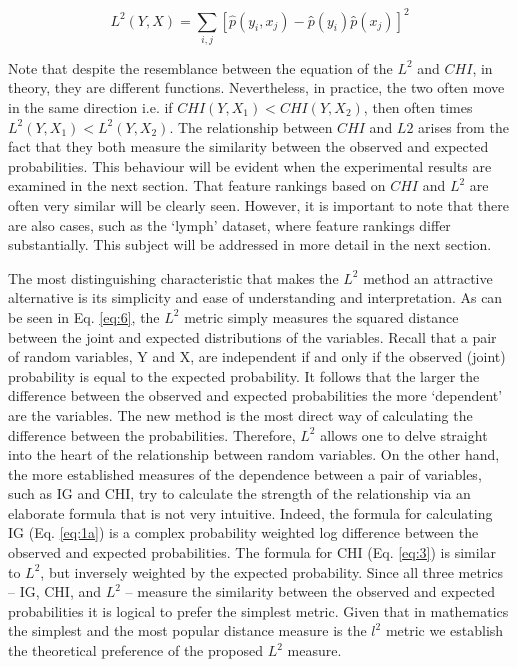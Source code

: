 \documentclass[review]{elsarticle}
\begin{document}
\begin{equation}\label{eq:6}
L^2 (Y,X)=\sum_{i,j} [ \hat{p}(y_i,x_j )-p ̂(y_i ) p ̂(x_j )]^2 
\end{equation}

Note that despite the resemblance between the equation of the $ L^2 $ and $ CHI $, in theory, they are different functions. Nevertheless, in practice, the two often move in the same direction i.e. if $ CHI(Y,X_1 ) < CHI(Y,X_2 ) $, then often times $  L^2 (Y,X_1 ) < L^2 (Y,X_2 ) $. The relationship between $ CHI $ and $ L2 $ arises from the fact that they both measure the similarity between the observed and expected probabilities. This behaviour will be evident when the experimental results are examined in the next section. That feature rankings based on $ CHI $ and $ L^2 $ are often very similar will be clearly seen. However, it is important to note that there are also cases, such as the ‘lymph’ dataset, where feature rankings differ substantially. This subject will be addressed in more detail in the next section. 

The most distinguishing characteristic that makes the $ L^2 $ method an attractive alternative is its simplicity and ease of understanding and interpretation. As can be seen in Eq. \ref{eq:6}, the $ L^2 $ metric simply measures the squared distance between the joint and expected distributions of the variables. Recall that a pair of random variables,  Y and X, are independent if and only if the observed (joint) probability is equal to the expected probability. It follows that the larger the difference between the observed and expected probabilities the more ‘dependent’ are the variables. The new method is the most direct way of calculating the difference between the probabilities. Therefore, $ L^2 $ allows one to delve straight into the heart of the relationship between random variables.  On the other hand, the more established measures of the dependence between a pair of variables, such as IG and CHI, try to calculate the strength of the relationship via an elaborate formula that is not very intuitive. Indeed, the formula for calculating IG (Eq. \ref{eq:1a}) is a complex probability weighted log difference between the observed and expected probabilities. The formula for CHI (Eq. \ref{eq:3}) is similar to $ L^2 $, but inversely weighted by the expected probability. Since all three metrics – IG, CHI, and $ L^2 $ – measure the similarity between the observed and expected probabilities it is logical to prefer the simplest metric. Given that in mathematics the simplest and the most popular distance measure is the $ l^2 $ metric we establish the theoretical preference of the proposed $ L^2 $ measure.
\end{document}
